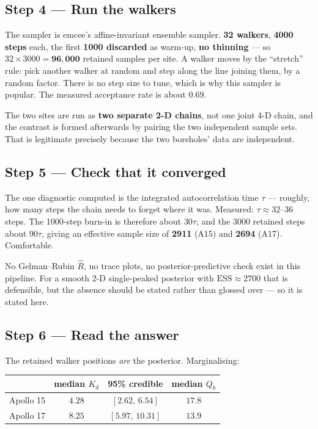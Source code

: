 \documentclass[11pt]{report}
\newcommand{\code}[1]{{\ttfamily\small #1}}
\begin{document}
\subsection*{Step 4 --- Run the walkers}
The sampler is \code{emcee}'s affine-invariant ensemble sampler.
\textbf{32 walkers}, \textbf{4000 steps} each, the first \textbf{1000
discarded} as warm-up, \textbf{no thinning} --- so $32\times3000 =
\mathbf{96{,}000}$ retained samples per site. A walker moves by the
``stretch'' rule: pick another walker at random and step along the line
joining them, by a random factor. There is no step size to tune, which is why
this sampler is popular. The measured acceptance rate is about $0.69$.

The two sites are run as \textbf{two separate 2-D chains}, not one joint 4-D
chain, and the contrast is formed afterwards by pairing the two independent
sample sets. That is legitimate precisely because the two boreholes' data are
independent.

\subsection*{Step 5 --- Check that it converged}
The one diagnostic computed is the integrated autocorrelation time $\tau$ ---
roughly, how many steps the chain needs to forget where it was. Measured:
$\tau \approx 32$--$36$ steps. The 1000-step burn-in is therefore about
$30\tau$, and the 3000 retained steps about $90\tau$, giving an effective
sample size of \textbf{2911} (A15) and \textbf{2694} (A17). Comfortable.

\begin{warn}
No Gelman--Rubin $\hat{R}$, no trace plots, no posterior-predictive check
exist in this pipeline. For a smooth 2-D single-peaked posterior with
$\mathrm{ESS}\approx2700$ that is defensible, but the absence should be
stated rather than glossed over --- so it is stated here.
\end{warn}

\subsection*{Step 6 --- Read the answer}
The retained walker positions \emph{are} the posterior. Marginalising:

\begin{center}\small
\begin{tabular}{@{}lccc@{}}
\toprule
& median $K_d$ & 95\% credible & median $Q_b$ \\
\midrule
Apollo 15 & $4.28$ & $[2.62,\,6.54]$ & $17.8$ \\
Apollo 17 & $8.25$ & $[5.97,\,10.31]$ & $13.9$ \\
\bottomrule
\end{tabular}
\end{center}
\end{document}
